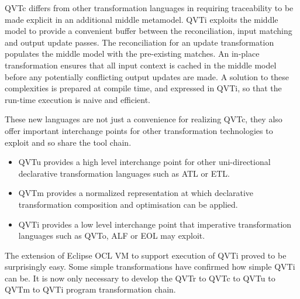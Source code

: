 \documentclass{llncs}
\begin{document}
QVTc differs from other transformation languages in requiring traceability to be made explicit in an additional middle metamodel. QVTi exploits the middle model to provide a convenient buffer between the reconciliation, input matching and output update passes. The reconciliation for an update transformation populates the middle model with the pre-existing matches. An in-place transformation ensures that all input context is cached in the middle model before any potentially conflicting output updates are made. A solution to these complexities is prepared at compile time, and expressed in QVTi, so that the run-time execution is naive and efficient.  

These new languages are not just a convenience for realizing QVTc, they also offer important interchange points for other transformation technologies to exploit and so share the tool chain.

\begin{itemize}
\item QVTu provides a high level interchange point for other uni-directional declarative transformation languages such as ATL or ETL.
\item QVTm provides a normalized representation at which declarative transformation composition and optimisation can be applied.
\item QVTi provides a low level interchange point that imperative transformation languages such as QVTo, ALF or EOL may exploit.
\end{itemize}

The extension of Eclipse OCL VM\cite{Willink2012} to support execution of QVTi proved to be surprisingly easy. Some simple transformations have confirmed how simple QVTi  can be. It is now only necessary to develop the QVTr to QVTc to QVTu to QVTm to QVTi program transformation chain.


\end{document}
